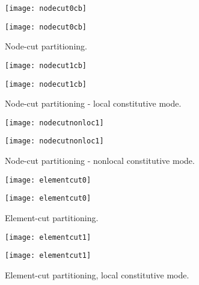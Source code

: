 \documentclass[a4paper]{article}
\begin{document}
\begin{figure}[htb]
\begin{htmlonly}
  \centerline{\texttt{[image: nodecut0cb]}}
\end{htmlonly}
\centerline{\texttt{[image: nodecut0cb]}}
\caption{Node-cut partitioning.}
\label{nodecut}
\end{figure}

\begin{figure}[htb]
\begin{htmlonly}
  \centerline{\texttt{[image: nodecut1cb]}}
\end{htmlonly}
\centerline{\texttt{[image: nodecut1cb]}}
\caption{Node-cut partitioning - local constitutive mode.}
\label{nodecut-lm}
\end{figure}

\begin{figure}[htb]
\begin{htmlonly}
  \centerline{\texttt{[image: nodecutnonloc1]}}
\end{htmlonly}
\centerline{\texttt{[image: nodecutnonloc1]}}
\caption{Node-cut partitioning - nonlocal constitutive mode.}
\label{nodecut-nlm}
\end{figure}


\begin{figure}[htb]
\begin{htmlonly}
  \centerline{\texttt{[image: elementcut0]}}
\end{htmlonly}
\centerline{\texttt{[image: elementcut0]}}
\caption{Element-cut partitioning.}
\label{elmentcut}
\end{figure}

\begin{figure}[htb]
\begin{htmlonly}
  \centerline{\texttt{[image: elementcut1]}}
\end{htmlonly}
\centerline{\texttt{[image: elementcut1]}}
\caption{Element-cut partitioning, local constitutive mode.}
\label{elmentcut-lm}
\end{figure}
\end{document}
